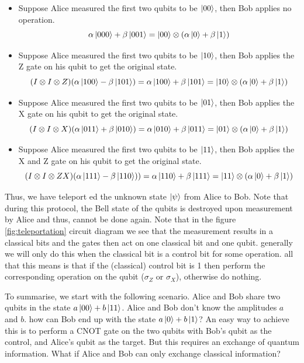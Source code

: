 \begin{enumerate}
    \begin{itemize}
        \item Suppose Alice measured the first two qubits to be $\ket{00}$, then Bob applies no operation.
        \[
            \alpha\ket{000}+\beta\ket{001}=\ket{00}\otimes (\alpha\ket{0}+\beta\ket{1})
        \]
        \item Suppose Alice measured the first two qubits to be $\ket{10}$, then Bob applies the Z gate on his qubit to get the original state.
        \[ 
            (I\otimes I \otimes Z)(\alpha\ket{100}-\beta\ket{101})=\alpha\ket{100}+\beta\ket{101}=\ket{10}\otimes (\alpha\ket{0}+\beta\ket{1})
        \]
        \item Suppose Alice measured the first two qubits to be $\ket{01}$, then Bob applies the X gate on his qubit to get the original state.
        \[ 
            (I\otimes I\otimes X)(\alpha\ket{011}+\beta\ket{010})=\alpha\ket{010}+\beta\ket{011}=\ket{01}\otimes (\alpha\ket{0}+\beta\ket{1})
        \]
        \item Suppose Alice measured the first two qubits to be $\ket{11}$, then Bob applies the X and Z gate on his qubit to get the original state.
        \[ 
          (I\otimes I\otimes ZX)(\alpha\ket{111}-\beta\ket{110}))=\alpha\ket{110}+\beta\ket{111}=\ket{11}\otimes (\alpha\ket{0}+\beta\ket{1})
        \]
    \end{itemize}
    Thus, we have teleport ed the unknown state $\ket{\psi}$ from Alice to Bob. Note that during this protocol, the Bell state of the qubits is destroyed upon measurement by Alice and thus, cannot be done again. Note that in the figure \ref{fig:teleportation} circuit diagram we see that the measurement results in a classical bits and the gates then act on one classical bit and one qubit. generally we will only do this when the classical bit is a control bit for some operation. all that this means is that if the (classical) control bit is 1 then perform the corresponding operation on the qubit ($\sigma_Z$ or $\sigma_X$), otherwise do nothing.
\end{enumerate}
To summarise, we start with the following scenario. Alice and Bob share two qubits in the state $a\ket{00}+b\ket{11}$. Alice and Bob don't know the amplitudes $a$ and $b$. how can Bob end up with the state $a\ket{0}+b\ket{1}$? An easy way to achieve this is to perform a CNOT gate on the two qubits with Bob's qubit as the control, and Alice's qubit as the target. But this requires an exchange of quantum information. What if Alice and Bob can only exchange classical information?

